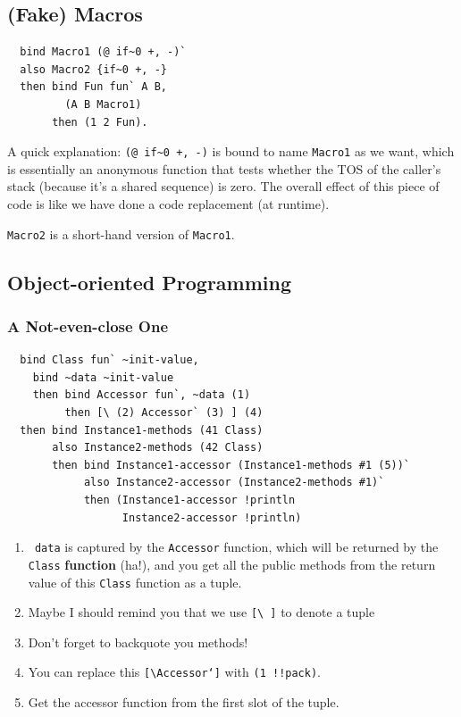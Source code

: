 \documentclass{report}
\newcommand{\mtilde}[1]{\textasciitilde}
\newcommand{\marg}[1]{\texttt{\mtilde ~#1}}
\begin{document}
\subsection{(Fake) Macros}
\label{ssec:macro}
\begin{mdframed}[style=example]
\begin{verbatim}
  bind Macro1 (@ if~0 +, -)`
  also Macro2 {if~0 +, -}
  then bind Fun fun` A B,
         (A B Macro1)
       then (1 2 Fun).
\end{verbatim}
\end{mdframed}

A quick explanation: \texttt{(@ if\textasciitilde 0 +, -)} is bound to name \texttt{Macro1} as we want, which is essentially an anonymous function that tests whether the TOS of the caller's stack (because it's a shared sequence) is zero. The overall effect of this piece of code is like we have done a code replacement (at runtime).

\texttt{Macro2} is a short-hand version of \texttt{Macro1}.

\subsection{Object-oriented Programming}

\subsubsection{A Not-even-close One}

\begin{mdframed}[style=example]
\begin{verbatim}
  bind Class fun` ~init-value,
    bind ~data ~init-value
    then bind Accessor fun`, ~data (1)
         then [\ (2) Accessor` (3) ] (4)
  then bind Instance1-methods (41 Class)
       also Instance2-methods (42 Class)
       then bind Instance1-accessor (Instance1-methods #1 (5))`
            also Instance2-accessor (Instance2-methods #1)`
            then (Instance1-accessor !println
                  Instance2-accessor !println)
\end{verbatim}
\end{mdframed}

\begin{enumerate}
\item \marg{data} is captured by the \texttt{Accessor} function, which will be returned by the \texttt{Class} \textbf{function} (ha!), and you get all the public methods from the return value of this \texttt{Class} function as a tuple.
\item Maybe I should remind you that we use \texttt{[\textbackslash ~]} to denote a tuple
\item Don't forget to backquote you methods!
\item You can replace this \texttt{[\textbackslash Accessor`]} with \texttt{(1 !!pack)}.
\item Get the accessor function from the first slot of the tuple.
\end{enumerate}
\end{document}
